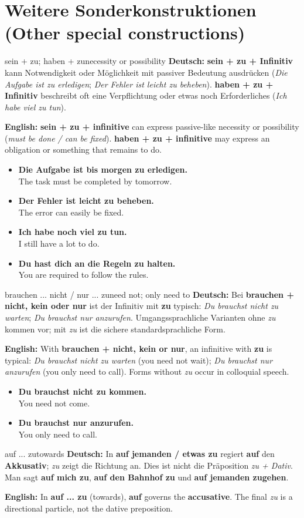 \documentclass[a4paper,11pt]{article}
\newcommand{\GermanText}[1]{\textbf{Deutsch: }#1\par}
\newcommand{\EnglishText}[1]{{\small\color{SoftGray}\textbf{English: }#1\par}}
\newcommand{\ExampleItem}[2]{\item \textbf{#1}\\{\small\color{SoftGray}#2}}
\begin{document}
\section{Weitere Sonderkonstruktionen (Other special constructions)}
\begin{grammarentry}{sein + zu; haben + zu}{necessity or possibility}
\GermanText{\textbf{sein + zu + Infinitiv} kann Notwendigkeit oder Möglichkeit mit passiver Bedeutung ausdrücken (\emph{Die Aufgabe ist zu erledigen}; \emph{Der Fehler ist leicht zu beheben}). \textbf{haben + zu + Infinitiv} beschreibt oft eine Verpflichtung oder etwas noch Erforderliches (\emph{Ich habe viel zu tun}).}
\EnglishText{\textbf{sein + zu + infinitive} can express passive-like necessity or possibility (\emph{must be done / can be fixed}). \textbf{haben + zu + infinitive} may express an obligation or something that remains to do.}
\end{grammarentry}
\begin{exbox}
\begin{itemize}
\ExampleItem{Die Aufgabe ist bis morgen zu erledigen.}{The task must be completed by tomorrow.}
\ExampleItem{Der Fehler ist leicht zu beheben.}{The error can easily be fixed.}
\ExampleItem{Ich habe noch viel zu tun.}{I still have a lot to do.}
\ExampleItem{Du hast dich an die Regeln zu halten.}{You are required to follow the rules.}
\end{itemize}
\end{exbox}
\begin{grammarentry}{brauchen ... nicht / nur ... zu}{need not; only need to}
\GermanText{Bei \textbf{brauchen + nicht, kein oder nur} ist der Infinitiv mit \textbf{zu} typisch: \emph{Du brauchst nicht zu warten}; \emph{Du brauchst nur anzurufen}. Umgangssprachliche Varianten ohne \emph{zu} kommen vor; mit \emph{zu} ist die sichere standardsprachliche Form.}
\EnglishText{With \textbf{brauchen + nicht, kein or nur}, an infinitive with \textbf{zu} is typical: \emph{Du brauchst nicht zu warten} (you need not wait); \emph{Du brauchst nur anzurufen} (you only need to call). Forms without \emph{zu} occur in colloquial speech.}
\end{grammarentry}
\begin{exbox}
\begin{itemize}
\ExampleItem{Du brauchst nicht zu kommen.}{You need not come.}
\ExampleItem{Du brauchst nur anzurufen.}{You only need to call.}
\end{itemize}
\end{exbox}
\begin{grammarentry}{auf ... zu}{towards}
\GermanText{In \textbf{auf jemanden / etwas zu} regiert \textbf{auf} den \textbf{Akkusativ}; \emph{zu} zeigt die Richtung an. Dies ist nicht die Präposition \emph{zu + Dativ}. Man sagt \textbf{auf mich zu}, \textbf{auf den Bahnhof zu} und \textbf{auf jemanden zugehen}.}
\EnglishText{In \textbf{auf ... zu} (towards), \textbf{auf} governs the \textbf{accusative}. The final \emph{zu} is a directional particle, not the dative preposition.}
\end{grammarentry}
\end{document}
